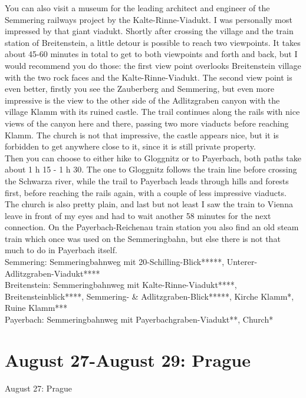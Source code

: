 {You can also visit a museum for the leading architect and engineer of the Semmering railways project by the Kalte-Rinne-Viadukt. I was personally most impressed by that giant viadukt. Shortly after crossing the village and the train station of Breitenstein, a little detour is possible to reach two viewpoints. It takes about 45-60 minutes in total to get to both viewpoints and forth and back, but I would recommend you do those: the first view point overlooks Breitenstein village with the two rock faces and the Kalte-Rinne-Viadukt. The second view point is even better, firstly you see the Zauberberg and Semmering, but even more impressive is the view to the other side of the Adlitzgraben canyon with the village Klamm with its ruined castle. The trail continues along the rails with nice views of the canyon here and there, passing two more viaducts before reaching Klamm. The church is not that impressive, the castle appears nice, but it is forbidden to get anywhere close to it, since it is still private property.\\

Then you can choose to either hike to Gloggnitz or to Payerbach, both paths take about 1 h 15 - 1 h 30. The one to Gloggnitz follows the train line before crossing the Schwarza river, while the trail to Payerbach leads through hills and forests first, before reaching the rails again, with a couple of less impressive viaducts. The church is also pretty plain, and last but not least I saw the train to Vienna leave in front of my eyes and had to wait another 58 minutes for the next connection. On the Payerbach-Reichenau train station you also find an old steam train which once was used on the Semmeringbahn, but else there is not that much to do in Payerbach itself.\\

Semmering: Semmeringbahnweg mit 20-Schilling-Blick*****, Unterer-Adlitzgraben-Viadukt****\\
Breitenstein: Semmeringbahnweg mit Kalte-Rinne-Viadukt****, Breitensteinblick****, Semmering- \& Adlitzgraben-Blick*****, Kirche Klamm*, Ruine Klamm***\\
Payerbach: Semmeringbahnweg mit Payerbachgraben-Viadukt**, Church*

\section{August 27-August 29: Prague}
\label{2021Prague}

August 27: Prague\\

}
